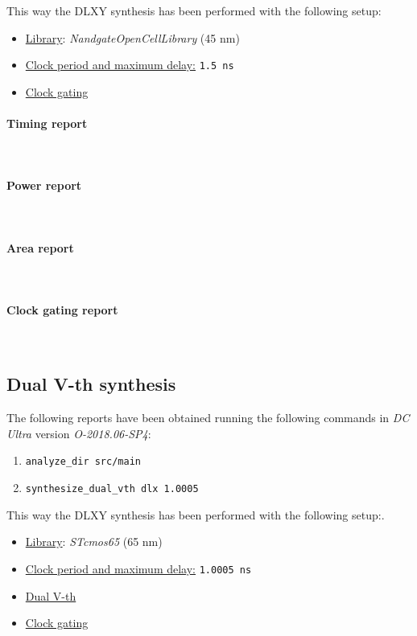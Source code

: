 \bigskip
This way the DLXY synthesis has been performed with the following setup:
\begin{itemize}
	\item \underline{Library}: \textit{NandgateOpenCellLibrary} (45 nm)
	\item \underline{Clock period and maximum delay:} \texttt{1.5 ns}
	\item \underline{Clock gating}
\end{itemize}

\paragraph{Timing report} \mbox{} \\

\paragraph{Power report} \mbox{} \\

\paragraph{Area report} \mbox{} \\

\paragraph{Clock gating report} \mbox{} \\


\subsection{Dual V-th synthesis}
The following reports have been obtained running the following commands in
\textit{DC Ultra} version \textit{O-2018.06-SP4}:
\begin{enumerate}
	\item \texttt{analyze\_dir src/main}
	\item \texttt{synthesize\_dual\_vth dlx 1.0005}
\end{enumerate}

\bigskip
This way the DLXY synthesis has been performed with the following setup:.
\begin{itemize}
	\item \underline{Library}: \textit{STcmos65} (65 nm)
	\item \underline{Clock period and maximum delay:} \texttt{1.0005 ns}
	\item \underline{Dual V-th}
	\item \underline{Clock gating}
\end{itemize}

